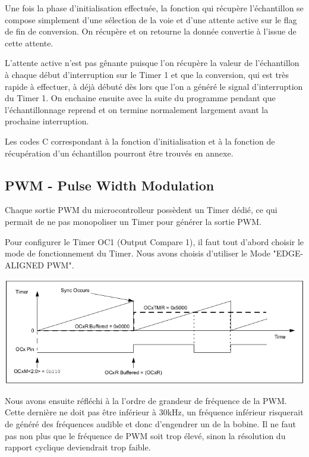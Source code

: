 \documentclass[11pt, french]{article} %
\begin{document}
\vspace{0.5cm}

Une fois la phase d'initialisation effectuée, la fonction qui récupère l'échantillon se compose simplement d'une sélection de la voie et d'une attente active sur le flag de fin de conversion. On récupère et on retourne la donnée convertie à l'issue de cette attente. 

\vspace{0.5cm}

L'attente active n'est pas gênante puisque l'on récupère la valeur de l'échantillon à chaque début d'interruption sur le Timer 1 et que la conversion, qui est très rapide à effectuer, à déjà débuté dès lors que l'on a généré le signal d'interruption du Timer 1. On enchaine ensuite avec la suite du programme pendant que l'échantillonnage reprend et on termine normalement largement avant la prochaine interruption.

\vspace{0.5cm}

Les codes C correspondant à la fonction d'initialisation et à la fonction de récupération d'un échantillon pourront être trouvés en annexe. 

\subsection{PWM - Pulse Width Modulation}

Chaque sortie PWM du microcontrolleur possèdent un Timer dédié, ce qui permait de ne pas monopoliser un Timer pour générer la sortie PWM.

Pour configurer le Timer OC1 (Output Compare 1), il faut tout d'abord choisir le mode de fonctionnement du Timer. Nous avons choisis d'utiliser le Mode "EDGE-ALIGNED PWM".

\begin{center}
\includegraphics[width = 15cm]{SolutionAnalogique/PWMMode.png} 
\end{center}

Nous avons ensuite réfléchi à la l'ordre de grandeur de fréquence de la PWM. Cette dernière ne doit pas être inférieur à 30kHz, un fréquence inférieur risquerait de généré des fréquences audible et donc d'engendrer un  de la bobine. Il ne faut pas non plus que le fréquence de PWM soit trop élevé, sinon la résolution du rapport cyclique deviendrait trop faible.
\end{document}
